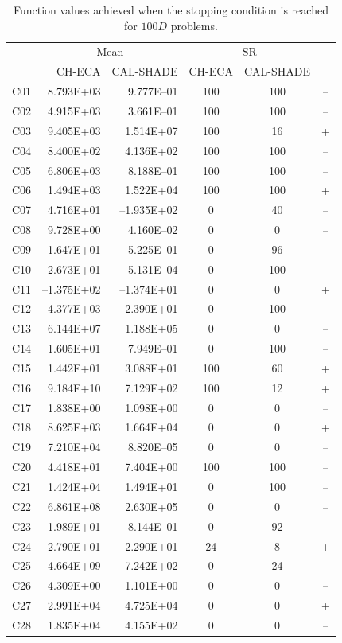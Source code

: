 \documentclass[conference]{IEEEtran}
\begin{document}
% 
% 
% 
\begin{table}[!ht]
	\caption{Function values achieved when the stopping condition is reached for $100D$ problems.}
	\centering
	\begin{tabular}{|c|r|r|c|c|c|}
	 \hline
	 &\multicolumn{2}{|c|}{Mean} & \multicolumn{2}{|c|}{SR} & \\
	\cline{2-5}
	 & CH-ECA & CAL-SHADE & CH-ECA & CAL-SHADE & \\ \hline

  C01 & 8.793E+03  & 9.777E--01  &  100 &  100 & -- \\ 
  C02 & 4.915E+03  & 3.661E--01  &  100 &  100 & -- \\ 
  C03 & 9.405E+03  & 1.514E+07  &  100 &   16 & + \\ 
  C04 & 8.400E+02  & 4.136E+02  &  100 &  100 & -- \\ 
  C05 & 6.806E+03  & 8.188E--01  &  100 &  100 & -- \\ 
  C06 & 1.494E+03  & 1.522E+04  &  100 &  100 & + \\ 
  C07 & 4.716E+01  &--1.935E+02 &    0 &   40 & -- \\ 
  C08 & 9.728E+00  & 4.160E--02  &    0 &    0 & -- \\ 
  C09 & 1.647E+01  & 5.225E--01  &    0 &   96 & -- \\ 
  C10 & 2.673E+01  & 5.131E--04  &    0 &  100 & -- \\ 
  C11 &--1.375E+02 &--1.374E+01 &    0 &    0 & + \\ 
  C12 & 4.377E+03  & 2.390E+01  &    0 &  100 & -- \\ 
  C13 & 6.144E+07  & 1.188E+05  &    0 &    0 & -- \\ 
  C14 & 1.605E+01  & 7.949E--01  &    0 &  100 & -- \\ 
  C15 & 1.442E+01  & 3.088E+01  &  100 &   60 & + \\ 
  C16 & 9.184E+10  & 7.129E+02  &  100 &   12 & + \\ 
  C17 & 1.838E+00  & 1.098E+00  &    0 &    0 & -- \\ 
  C18 & 8.625E+03  & 1.664E+04  &    0 &    0 & + \\ 
  C19 & 7.210E+04  & 8.820E--05  &    0 &    0 & -- \\ 
  C20 & 4.418E+01  & 7.404E+00  &  100 &  100 & -- \\ 
  C21 & 1.424E+04  & 1.494E+01  &    0 &  100 & -- \\ 
  C22 & 6.861E+08  & 2.630E+05  &    0 &    0 & -- \\ 
  C23 & 1.989E+01  & 8.144E--01  &    0 &   92 & -- \\ 
  C24 & 2.790E+01  & 2.290E+01  &   24 &    8 & + \\ 
  C25 & 4.664E+09  & 7.242E+02  &    0 &   24 & -- \\ 
  C26 & 4.309E+00  & 1.101E+00  &    0 &    0 & -- \\ 
  C27 & 2.991E+04  & 4.725E+04  &    0 &    0 & + \\ 
  C28 & 1.835E+04  & 4.155E+02  &    0 &    0 & -- \\ 
   \hline
	\end{tabular}
	\label{tab:d100c}
\end{table}


\end{document}

